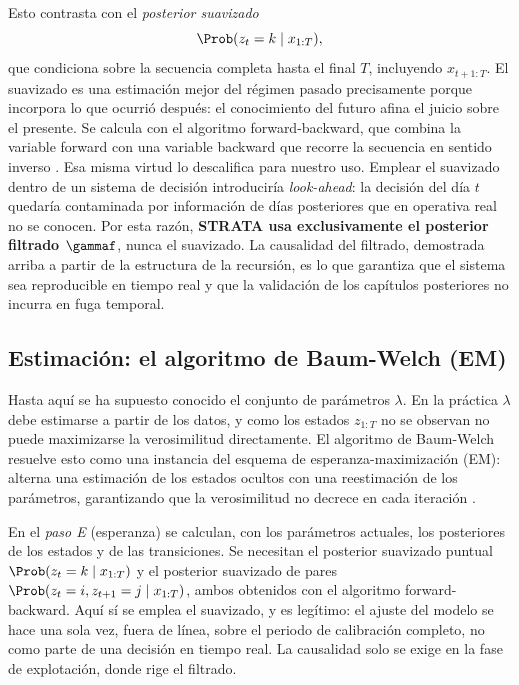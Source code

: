 Esto contrasta con el \emph{posterior suavizado}
\[
\Prob(z_t = k \mid x_{1:T}),
\]
que condiciona sobre la secuencia completa hasta el final $T$, incluyendo $x_{t+1:T}$. El suavizado es una estimación mejor del régimen pasado precisamente porque incorpora lo que ocurrió después: el conocimiento del futuro afina el juicio sobre el presente. Se calcula con el algoritmo forward-backward, que combina la variable forward con una variable backward que recorre la secuencia en sentido inverso \cite{baum1970, rabiner1989}. Esa misma virtud lo descalifica para nuestro uso. Emplear el suavizado dentro de un sistema de decisión introduciría \emph{look-ahead}: la decisión del día $t$ quedaría contaminada por información de días posteriores que en operativa real no se conocen. Por esta razón, \textbf{STRATA usa exclusivamente el posterior filtrado $\gammaf$}, nunca el suavizado. La causalidad del filtrado, demostrada arriba a partir de la estructura de la recursión, es lo que garantiza que el sistema sea reproducible en tiempo real y que la validación de los capítulos posteriores no incurra en fuga temporal.

\subsection{Estimación: el algoritmo de Baum-Welch (EM)}
\label{sec:hmm-em}

Hasta aquí se ha supuesto conocido el conjunto de parámetros $\lambda$. En la práctica $\lambda$ debe estimarse a partir de los datos, y como los estados $z_{1:T}$ no se observan no puede maximizarse la verosimilitud directamente. El algoritmo de Baum-Welch resuelve esto como una instancia del esquema de esperanza-maximización (EM): alterna una estimación de los estados ocultos con una reestimación de los parámetros, garantizando que la verosimilitud no decrece en cada iteración \cite{baum1970, rabiner1989}.

En el \emph{paso E} (esperanza) se calculan, con los parámetros actuales, los posteriores de los estados y de las transiciones. Se necesitan el posterior suavizado puntual $\Prob(z_t = k \mid x_{1:T})$ y el posterior suavizado de pares $\Prob(z_t = i, z_{t+1} = j \mid x_{1:T})$, ambos obtenidos con el algoritmo forward-backward. Aquí sí se emplea el suavizado, y es legítimo: el ajuste del modelo se hace una sola vez, fuera de línea, sobre el periodo de calibración completo, no como parte de una decisión en tiempo real. La causalidad solo se exige en la fase de explotación, donde rige el filtrado.

